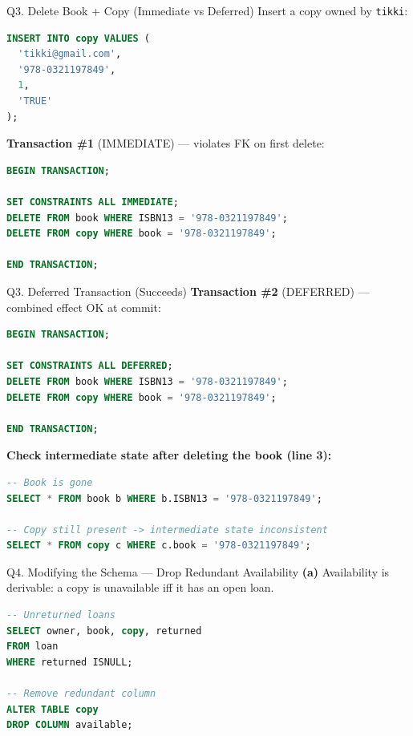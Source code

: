 \documentclass{beamer}
\begin{document}
\begin{frame}[fragile]{Q3. Delete Book + Copy (Immediate vs Deferred)}
Insert a copy owned by \texttt{tikki}:
\begin{lstlisting}[language=SQL]
INSERT INTO copy VALUES (
  'tikki@gmail.com',
  '978-0321197849',
  1,
  'TRUE'
);
\end{lstlisting}

\textbf{Transaction \#1} (IMMEDIATE) — violates FK on first delete:
\begin{lstlisting}[language=SQL]
BEGIN TRANSACTION;

SET CONSTRAINTS ALL IMMEDIATE;
DELETE FROM book WHERE ISBN13 = '978-0321197849';
DELETE FROM copy WHERE book = '978-0321197849';

END TRANSACTION;
\end{lstlisting}
\end{frame}

\begin{frame}[fragile]{Q3. Deferred Transaction (Succeeds)}
\textbf{Transaction \#2} (DEFERRED) — combined effect OK at commit:
\begin{lstlisting}[language=SQL]
BEGIN TRANSACTION;

SET CONSTRAINTS ALL DEFERRED;
DELETE FROM book WHERE ISBN13 = '978-0321197849';
DELETE FROM copy WHERE book = '978-0321197849';

END TRANSACTION;
\end{lstlisting}

\textbf{Check intermediate state after deleting the book (line 3):}
\begin{lstlisting}[language=SQL]
-- Book is gone
SELECT * FROM book b WHERE b.ISBN13 = '978-0321197849';

-- Copy still present -> intermediate state inconsistent
SELECT * FROM copy c WHERE c.book = '978-0321197849';
\end{lstlisting}
\end{frame}

\begin{frame}[fragile]{Q4. Modifying the Schema — Drop Redundant Availability}
\textbf{(a)} Availability is derivable: a copy is unavailable iff it has an open loan.
\begin{lstlisting}[language=SQL]
-- Unreturned loans
SELECT owner, book, copy, returned
FROM loan
WHERE returned ISNULL;

-- Remove redundant column
ALTER TABLE copy
DROP COLUMN available;
\end{lstlisting}
\end{frame}
\end{document}
